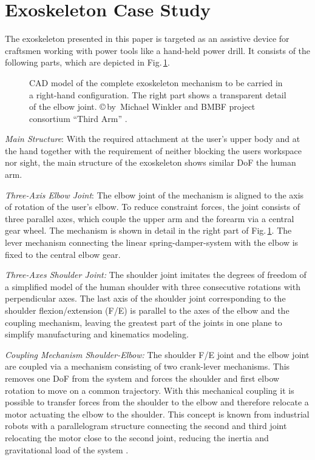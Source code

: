 \documentclass{svproc}
\begin{document}
\section{Exoskeleton Case Study}
\label{sec:exo_scenario}

The exoskeleton presented in this paper is targeted as an assistive device for craftsmen working with power tools like a hand-held power drill.
It consists of the following parts, which are depicted in Fig.\,\ref{fig:KAS5_CAD}.

\begin{figure}[b!]
    \vspace{-0.3cm}
    
    \vspace{-0.3cm}
    \caption{CAD model of the complete exoskeleton mechanism to be carried in a right-hand configuration. The right part shows a transparent detail of the elbow joint.
    \copyright\,by~Michael Winkler and BMBF project consortium ``Third Arm'' \cite{NuelleSchTapLil2017}.}
    \label{fig:KAS5_CAD}
\end{figure} 

\emph{Main Structure}:
%
With the required attachment at the user's upper body and at the hand together with the requirement of neither blocking the users workspace nor sight, the main structure of the exoskeleton shows similar DoF  the human arm.

\emph{Three-Axis Elbow Joint}:
The elbow joint of the mechanism is aligned to the axis of rotation of the user's elbow.
To reduce  constraint forces, the joint consists of three parallel axes, which couple the upper arm and the forearm via a central gear wheel.
The mechanism is shown in detail in the right part of Fig.\,\ref{fig:KAS5_CAD}.
The lever mechanism connecting the linear spring-damper-system with the elbow is fixed to the central elbow gear.

\emph{Three-Axes Shoulder Joint:}
The shoulder joint imitates the degrees of freedom of a simplified model of the human shoulder with three consecutive rotations with perpendicular axes.
The last axis of the shoulder joint corresponding to the shoulder flexion/extension (F/E) is parallel to the axes of the elbow and the coupling mechanism, leaving the greatest part of the joints in one plane to simplify manufacturing and kinematics modeling.

\emph{Coupling Mechanism Shoulder-Elbow:}
The shoulder F/E joint and the elbow joint are coupled via a mechanism consisting of two crank-lever mechanisms.
This removes one DoF from the system and forces the shoulder and first elbow rotation to move on a common trajectory.
With this mechanical coupling it is possible to transfer forces from the shoulder to the elbow and therefore relocate a motor actuating the elbow to the shoulder.
This concept is known from industrial robots with a parallelogram structure connecting the second and third joint relocating the motor close to the second joint, reducing the inertia and gravitational load of the system \cite{LuhZhe1985}.
\end{document}
